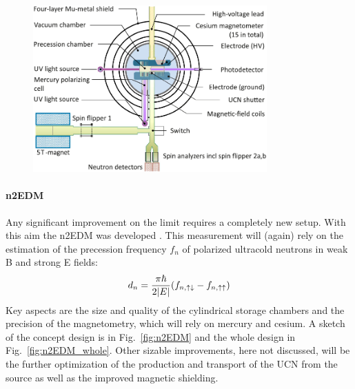 \begin{refsection}
            \begin{figure}
                \centering
                \includegraphics[width = 0.8\textwidth]{Figures/Introduction/nEDM.png}
                \caption{}
                \label{fig:nEDM}
            \end{figure}
            
            \paragraph{n2EDM} Any significant improvement on the limit requires a completely new setup. With this aim the n2EDM was developed \cite{n2EDM}.
            This measurement will (again) rely on the estimation of the precession frequency $f_n$ of polarized ultracold neutrons in weak B and strong E fields:
            $$d_n = \frac{\pi\hbar}{2\abs{E}}(f_{n, \uparrow\downarrow}-f_{n, \uparrow\uparrow})$$
            Key aspects are the size and quality of the cylindrical storage chambers and the precision of the magnetometry, which will rely on mercury and cesium.
            A sketch of the concept design is in Fig.~\ref{fig:n2EDM} and the whole design in Fig.~\ref{fig:n2EDM_whole}.
            Other sizable improvements, here not discussed, will be the further optimization of the production and transport of the UCN from the source as well as the improved magnetic shielding.\\


\end{refsection}
